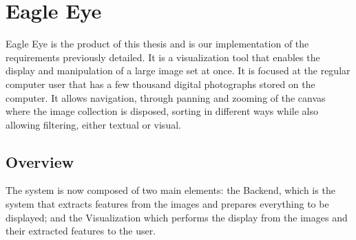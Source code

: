 \section{Eagle Eye}
\label{cha:eagle_eye}


Eagle Eye is the product of this thesis and is our implementation of the requirements previously detailed. It is a visualization tool that enables the display and manipulation of a large image set at once. It is focused at the regular computer user that has a few thousand digital photographs stored on the computer. It allows navigation, through panning and zooming of the canvas where the image collection is disposed, sorting in different ways while also allowing filtering, either textual or visual.


\subsection{Overview}

The system is now composed of two main elements: the Backend, which is the system that extracts features from the images and prepares everything to be displayed; and the Visualization which performs the display from the images and their extracted features to the user.
















